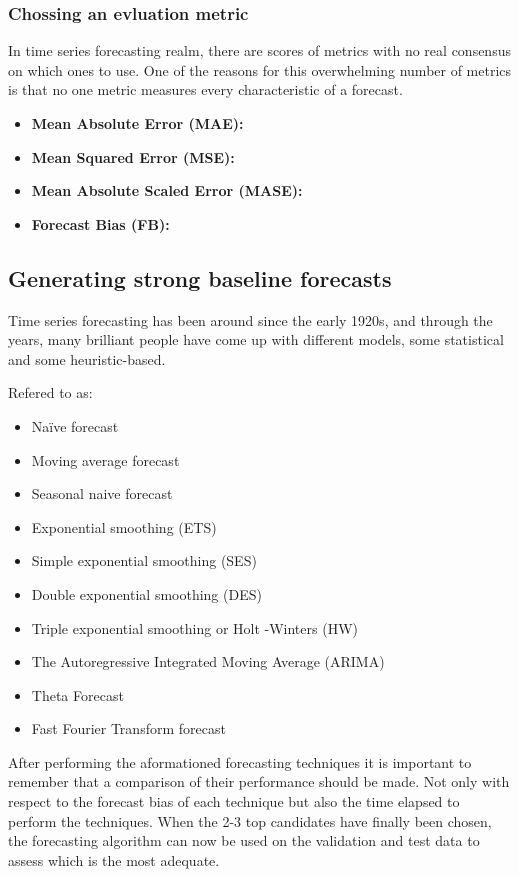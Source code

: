 \documentclass{article}
\begin{document}
\subsubsection{Chossing an evluation metric}
In time series forecasting
realm, there are scores of metrics with no real consensus on which ones to use. One of the reasons for
this overwhelming number of metrics is that no one metric measures every characteristic of a forecast.

\begin{itemize}
    \item \textbf{Mean Absolute Error (MAE):}
    \item \textbf{Mean Squared Error (MSE):}
    \item \textbf{Mean Absolute Scaled Error (MASE):}
    \item \textbf{Forecast Bias (FB):}

\end{itemize}

\subsection{Generating strong baseline forecasts}
Time series forecasting has been around since the early 1920s, and through the years, many brilliant
people have come up with different models, some statistical and some heuristic-based.

Refered to as:
\begin{itemize}
    \item Naïve forecast
    \item Moving average forecast
    \item Seasonal naive forecast
    \item Exponential smoothing (ETS)
    \item Simple exponential smoothing (SES)
    \item Double exponential smoothing (DES)
    \item Triple exponential smoothing or Holt -Winters (HW)
    \item The Autoregressive Integrated Moving Average (ARIMA)
    \item Theta Forecast
    \item Fast Fourier Transform forecast
\end{itemize}
After performing the aformationed forecasting techniques it is important to remember that a comparison of their performance should be made. Not only with respect to the forecast bias of each technique but also the time elapsed to perform the techniques.
When the 2-3 top candidates have finally been chosen, the forecasting algorithm can now be used on the validation and test data to assess which is the most adequate. 
\end{document}
